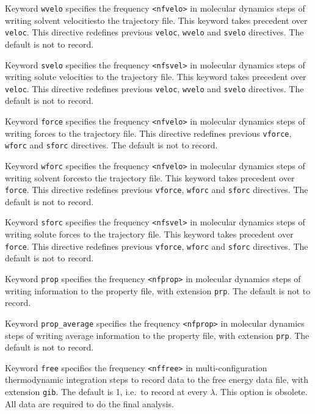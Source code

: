 \begin{description}
Keyword \verb+wvelo+
specifies the frequency \verb+<nfvelo>+ in molecular dynamics steps
of writing solvent velocitiesto the trajectory file. This keyword
takes precedent over \verb+veloc+. This directive redefines
previous \verb+veloc+, \verb+wvelo+ and \verb+svelo+
directives. 
The default is not to record.

Keyword \verb+svelo+
specifies the frequency \verb+<nfsvel>+ in molecular dynamics steps
of writing solute velocities to the trajectory file. This keyword
takes precedent over \verb+veloc+. This directive redefines
previous \verb+veloc+, \verb+wvelo+ and \verb+svelo+
directives. 
The default is not to record.

Keyword \verb+force+
specifies the frequency \verb+<nfvelo>+ in molecular dynamics steps
of writing forces to the trajectory file. This directive redefines
previous \verb+vforce+, \verb+wforc+ and \verb+sforc+
directives. 
The default is not to record.

Keyword \verb+wforc+
specifies the frequency \verb+<nfvelo>+ in molecular dynamics steps
of writing solvent forcesto the trajectory file. This keyword
takes precedent over \verb+force+. This directive redefines
previous \verb+vforce+, \verb+wforc+ and \verb+sforc+
directives. 
The default is not to record.

Keyword \verb+sforc+
specifies the frequency \verb+<nfsvel>+ in molecular dynamics steps
of writing solute forces to the trajectory file. This keyword
takes precedent over \verb+force+. This directive redefines
previous \verb+vforce+, \verb+wforc+ and \verb+sforc+
directives. 
The default is not to record.

Keyword \verb+prop+
specifies the frequency \verb+<nfprop>+ in molecular dynamics steps
of writing information to the property file, with extension
\verb+prp+. The default is not to record.

Keyword \verb+prop_average+
specifies the frequency \verb+<nfprop>+ in molecular dynamics steps
of writing average information to the property file, with extension
\verb+prp+. 
The default is not to record.

Keyword \verb+free+
specifies the frequency \verb+<nffree>+ in multi-configuration
thermodynamic integration steps to record data to the
free energy data file, with extension \verb+gib+.
The default is 1, i.e.\ to record at every $\lambda$.
This option is obsolete. All data are required to do the
final analysis.


\end{description}
